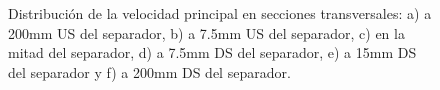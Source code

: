 \documentclass[9pt,mathserif]{beamer}
\begin{document}
{\begin{textblock}{12}
\begin{figure}[ht]
        \caption{Distribución de la velocidad principal en secciones transversales: a) a 200mm US del separador, b) a 7.5mm US del separador, c) en la mitad del separador, d) a 7.5mm DS del separador, e) a 15mm DS del separador y f) a 200mm DS del separador.}
  \end{figure}
  \end{textblock}
}

\end{document}

